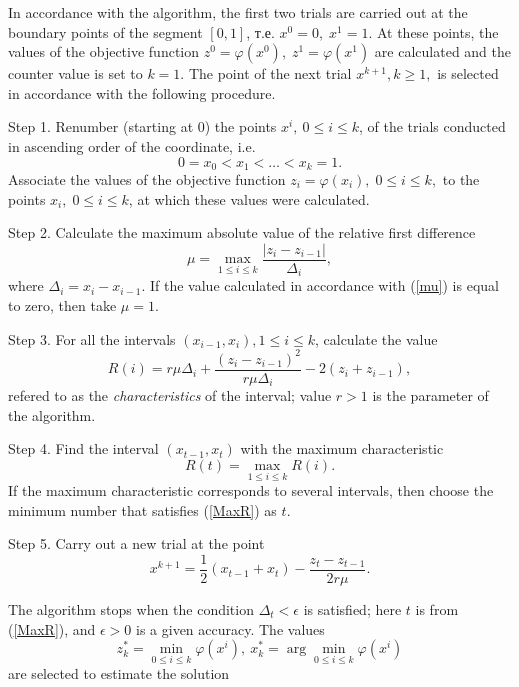 \documentclass[entropy,article,submit,moreauthors,pdftex]{Definitions/mdpi}
\begin{document}
In accordance with the algorithm, the first two trials are carried out at the boundary points of the segment $[0,1]$, т.е. $x^0=0,\;x^1=1$. 
At these points, the values of the objective function  $z^0=\varphi(x^0),\;z^1=\varphi(x^1)$ are calculated and the counter value is set to $k=1$. 
The point of the next trial $x^{k+1}, k\geq 1,$ is selected in accordance with the following procedure.

 Step 1. Renumber  (starting at 0) the points $x^i,\:0\leq i\leq k$, of the trials conducted  in ascending order of the coordinate, i.e.
\begin{equation}\label{xt}
0=x_0<x_1<\ldots <x_{k}=1.
\end{equation} 
Associate the values of the objective function $z_i=\varphi(x_i), \; 0\leq i\leq k,$ to the points $x_i, \; 0\leq i\leq k$, at which these values were calculated.

Step 2. Calculate the maximum absolute value of the relative first difference
\begin{equation}\label{mu}
\mu=\max_{1\leq i\leq k}\frac{\left|z_i-z_{i-1}\right|}{\Delta_i},
\end{equation}
where $\Delta_i = x_i-x_{i-1}$. If the value calculated in accordance with (\ref{mu}) is equal to zero, then take $\mu = 1$.

Step 3. For all the intervals $(x_{i-1},x_i),1\leq i\leq k$,  calculate the value
\begin{equation}\label{R}
R(i)=r\mu\Delta_i+\frac{(z_i-z_{i-1})^2}{r\mu\Delta_i}-2(z_i+z_{i-1}),
\end{equation} 
refered to as the \textit{characteristics} of the interval; value $r>1$ is the parameter of the algorithm. 

Step 4. Find the interval $(x_{t-1},x_t)$ with the maximum characteristic
\begin{equation}\label{MaxR}
R(t)=\max_{1\leq i\leq {k}}R(i).
\end{equation}
If the maximum characteristic corresponds to several intervals, then choose the minimum number that satisfies (\ref{MaxR}) as $t$.

Step 5. Carry out a new trial at the point
\begin{equation}\label{xk1}
x^{k+1}=\frac{1}{2}(x_{t-1}+x_t) - \frac{z_t-z_{t-1}}{2r\mu}.
\end{equation}

The algorithm stops when the condition  $\Delta_t<\epsilon$ is satisfied; here $t$ is from (\ref{MaxR}), and $\epsilon>0$ is a given accuracy. 
The values
\[
z_k^\ast=\min_{0\leq i \leq k}\varphi(x^i), \ x_k^\ast=\arg \min_{0\leq i \leq
 k}\varphi(x^i)
\] 
are selected to estimate the solution
\end{document}
